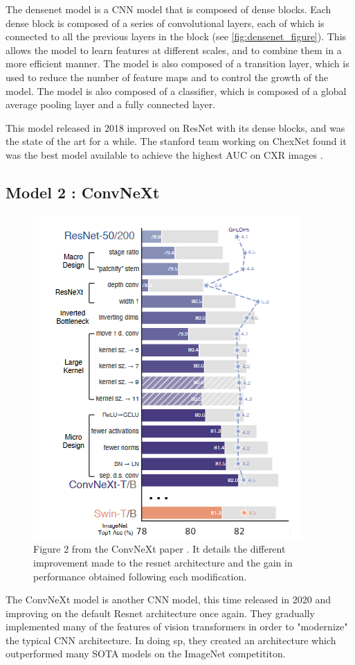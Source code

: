 \documentclass[11pt]{article}
\begin{document}
        The densenet model is a CNN model that is composed of dense blocks. Each dense block is composed of a series of convolutional layers,
        each of which is connected to all the previous layers in the block (see \ref{fig:densenet_figure}). This allows the model to learn features at different scales, and to
        combine them in a more efficient manner. The model is also composed of a transition layer, which is used to reduce the number of feature maps
        and to control the growth of the model. The model is also composed of a classifier, which is composed of a global average pooling layer and a fully connected layer.



        This model released in 2018 improved on ResNet with its dense blocks, and was the state of the art for a while. The stanford team working on ChexNet found it was the best model available to achieve the highest AUC on CXR images \cite{chexnet}.


    \subsection{Model 2 : ConvNeXt \cite{convnext}}


\begin{figure}[h]

     \centering
     \includegraphics[width=0.5 \textwidth]{plots/convnext_graph}
     \caption{Figure 2 from the ConvNeXt paper \cite{convnext}. It details the different improvement made to the
     resnet architecture and the gain in performance obtained following each modification.}
     \label{fig:convnext}

\end{figure}

        The ConvNeXt model is another CNN model, this time released in 2020 and improving on the default Resnet architecture once again.
        They gradually implemented many of the features of vision transformers in order to "modernize" the typical CNN architecture. In doing sp,
        they created an architecture which outperformed many SOTA models on the ImageNet competititon.
\end{document}
